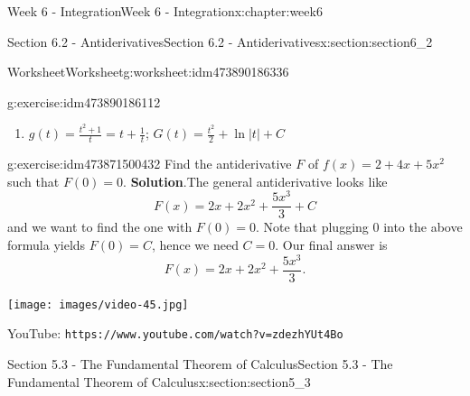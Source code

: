 \documentclass[oneside,10pt,]{book}
\newcommand{\blocktitlefont}{\relax}
\newcommand{\mono}[1]{\texttt{#1}}
\numberwithin{equation}{section}
\newlength{\qrsize}
\newlength{\previewwidth}
\begin{document}
\begin{chapterptx}{Week 6 - Integration}{}{Week 6 - Integration}{}{}{x:chapter:week6}
\begin{sectionptx}{Section 6.2 - Antiderivatives}{}{Section 6.2 - Antiderivatives}{}{}{x:section:section6_2}
\begin{worksheet-subsection}{Worksheet}{}{Worksheet}{}{}{g:worksheet:idm473890186336}
\begin{divisionexercise}{1}{}{}{g:exercise:idm473890186112}
\begin{enumerate}[label=(\alph*)]
\item{}\(g(t)=\frac{t^2+1}{t}=t+\frac 1t\); \(G(t) = \frac{t^2}{2}+\ln{\vert t \vert}+C\)%
\end{enumerate}
\end{divisionexercise}%
\begin{divisionexercise}{2}{}{}{g:exercise:idm473871500432}%
Find the antiderivative \(F\) of \(f(x)=2+4x+5x^2\) such that \(F(0)=0\).%
\textbf{\blocktitlefont Solution}.\hypertarget{g:solution:idm473871498896}{}\quad{}The general antiderivative looks like%
\begin{equation*}
F(x) = 2x+2x^2+\frac{5x^3}{3}+C 
\end{equation*}
and we want to find the one with \(F(0)=0\). Note that plugging 0 into the above formula yields \(F(0)=C\), hence we need \(C=0\). Our final answer is%
\begin{equation*}
F(x) = 2x+2x^2+\frac{5x^3}{3} \text{.}
\end{equation*}
%
\end{divisionexercise}%
\end{worksheet-subsection}
\restoregeometry
\setlength{\qrsize}{9em}
\setlength{\previewwidth}{\linewidth}
\addtolength{\previewwidth}{-\qrsize}
\begin{tcbraster}[raster columns=2, raster column skip=1pt, raster halign=center, raster force size=false, raster left skip=0pt, raster right skip=0pt]%
\begin{tcolorbox}[previewstyle, width=\previewwidth]%
\texttt{[image: images/video-45.jpg]}%
\end{tcolorbox}%
\begin{tcolorbox}[qrstyle]%
{\hypersetup{urlcolor=black}}%
\end{tcolorbox}%
\begin{tcolorbox}[captionstyle]%
\small YouTube: \mono{https://www.youtube.com/watch?v=zdezhYUt4Bo}\end{tcolorbox}%
\end{tcbraster}%
\end{sectionptx}
%
%
\typeout{************************************************}
\typeout{************************************************}
%
\begin{sectionptx}{Section 5.3 - The Fundamental Theorem of Calculus}{}{Section 5.3 - The Fundamental Theorem of Calculus}{}{}{x:section:section5_3}
\setlength{\qrsize}{9em}
\setlength{\previewwidth}{\linewidth}

\end{sectionptx}
\end{chapterptx}
\end{document}

